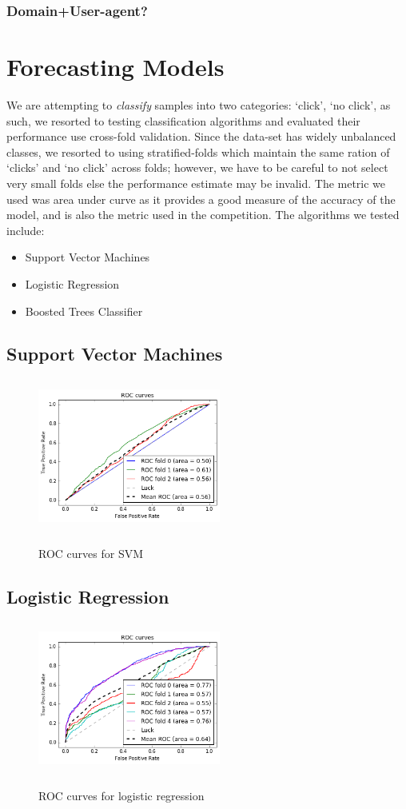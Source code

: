 \documentclass{article}
\begin{document}
		\subsubsection{Domain+User-agent?}

	\section{Forecasting Models}
		We are attempting to \textit{classify} samples into two categories: `click', `no click', as such, we resorted
		to testing classification algorithms and evaluated their performance use cross-fold validation. Since the data-set 
		has widely unbalanced classes, we resorted to using stratified-folds which maintain the same ration of `clicks' and `no click'
		across folds; however, we have to be careful to not select very small folds else the performance estimate may be invalid. The metric
		we used was area under curve as it provides a good measure of the accuracy of the model, and is also the metric used in the competition.
		The algorithms we tested include:
		\begin{itemize}
			\item Support Vector Machines
			\item Logistic Regression
			\item Boosted Trees Classifier 
		\end{itemize}
		\subsection{Support Vector Machines}
			\begin{figure}[H]
				\centering
				\includegraphics[width=6cm, height=5cm]{Images/svm.png}
				\label{fig:svm_roc}
				\caption{ROC curves for SVM}
			\end{figure}
		\subsection{Logistic Regression}
		\begin{figure}[H]
				\centering
				\includegraphics[width=6cm, height=5cm]{Images/logistic.png}
				\label{fig:log_roc}
				\caption{ROC curves for logistic regression}
			\end{figure}
\end{document}
